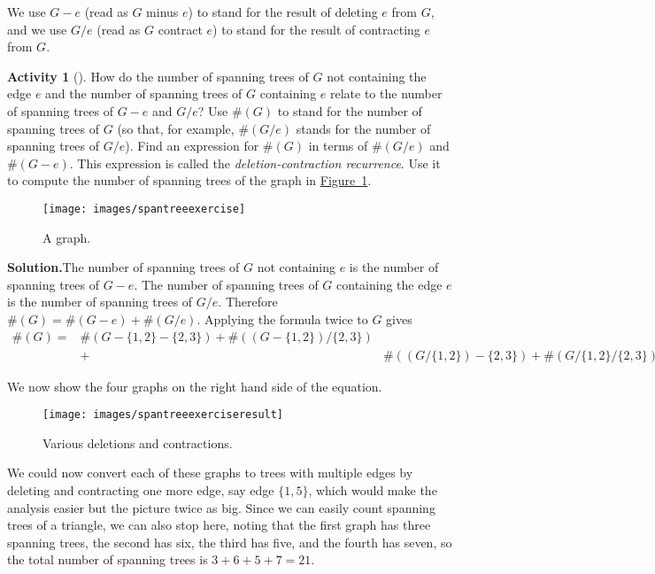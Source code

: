 \documentclass[10pt,]{book}
\theoremstyle{plain}
\theoremstyle{definition}
\newtheorem{activity}[project]{Activity}
\numberwithin{equation}{chapter}
\newcommand{\amp}{&}
\begin{document}
%
\par
We use \(G-e\) (read as \(G\) minus \(e\)) to stand for the result of deleting \(e\) from \(G\), and we use \(G/e\) (read as \(G\) contract \(e\)) to stand for the result of contracting \(e\) from \(G\).%
\begin{activity}[]\label{activity-109}
How do the number of spanning trees of \(G\) not containing the edge \(e\) and the number of spanning trees of \(G\) containing \(e\) relate to the number of spanning trees of \(G-e\) and \(G/e\)? Use \(\#(G)\) to stand for the number of spanning trees of \(G\) (so that, for example, \(\#(G/e)\) stands for the number of spanning trees of \(G/e\)). Find an expression for \(\#(G)\) in terms of \(\#(G/e)\) and \(\#(G-e)\). This expression is called the \emph{deletion-contraction recurrence}. Use it to compute the number of spanning trees of the graph in \hyperref[spantreeexercise]{Figure~\ref{spantreeexercise}}.%
\begin{figure}
\centering
\texttt{[image: images/spantreeexercise]}
\caption{A graph.\label{spantreeexercise}}
\end{figure}
\par\medskip\noindent%
\textbf{Solution.}\quad The number of spanning trees of \(G\) not containing \(e\) is the number of spanning trees of \(G-e\). The number of spanning trees of \(G\) containing the edge \(e\) is the number of spanning trees of \(G/e\). Therefore \(\#(G) =\#(G-e)
+\#(G/e)\). Applying the formula twice to \(G\) gives%
\begin{align*}
\#(G)
=\amp \#(G-\{1,2\}-\{2,3\}) + \#((G-\{1,2\})/\{2,3\})\\
\amp +\amp
\#((G/\{1,2\})-\{2,3\}) +
\#(G/\{1,2\}/\{2,3\}).
\end{align*}
%
\par
We now show the four graphs on the right hand side of the equation.%
\begin{figure}
\centering
\texttt{[image: images/spantreeexerciseresult]}
\caption{Various deletions and contractions.\label{spantreeexerciseresult}}
\end{figure}
We could now convert each of these graphs to trees with multiple edges by deleting and contracting one more edge, say edge \(\{1,5\}\), which would make the analysis easier but the picture twice as big. Since we can easily count spanning trees of a triangle, we can also stop here, noting that the first graph has three spanning trees, the second has six, the third has five, and the fourth has seven, so the total number of spanning trees is \(3+6+5+7=21\).%
\end{activity}
\typeout{************************************************}
\typeout{************************************************}
\end{document}

